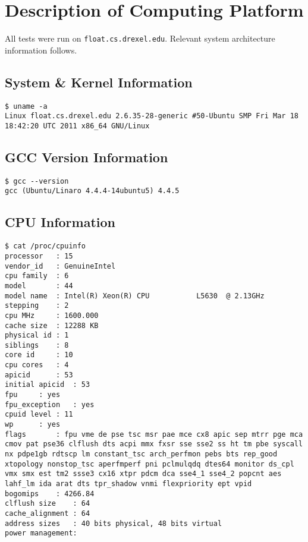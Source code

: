 \documentclass{article}
\begin{document}
\section{Description of Computing Platform}
All tests were run on \texttt{float.cs.drexel.edu}. Relevant system architecture information follows.
\subsection{System \& Kernel Information}
\begin{lstlisting}
$ uname -a
Linux float.cs.drexel.edu 2.6.35-28-generic #50-Ubuntu SMP Fri Mar 18 18:42:20 UTC 2011 x86_64 GNU/Linux
\end{lstlisting}
\subsection{GCC Version Information}
\begin{lstlisting}
$ gcc --version
gcc (Ubuntu/Linaro 4.4.4-14ubuntu5) 4.4.5
\end{lstlisting}
\subsection{CPU Information}
\begin{lstlisting}
$ cat /proc/cpuinfo
processor	: 15
vendor_id	: GenuineIntel
cpu family	: 6
model		: 44
model name	: Intel(R) Xeon(R) CPU           L5630  @ 2.13GHz
stepping	: 2
cpu MHz		: 1600.000
cache size	: 12288 KB
physical id	: 1
siblings	: 8
core id		: 10
cpu cores	: 4
apicid		: 53
initial apicid	: 53
fpu		: yes
fpu_exception	: yes
cpuid level	: 11
wp		: yes
flags		: fpu vme de pse tsc msr pae mce cx8 apic sep mtrr pge mca cmov pat pse36 clflush dts acpi mmx fxsr sse sse2 ss ht tm pbe syscall nx pdpe1gb rdtscp lm constant_tsc arch_perfmon pebs bts rep_good xtopology nonstop_tsc aperfmperf pni pclmulqdq dtes64 monitor ds_cpl vmx smx est tm2 ssse3 cx16 xtpr pdcm dca sse4_1 sse4_2 popcnt aes lahf_lm ida arat dts tpr_shadow vnmi flexpriority ept vpid
bogomips	: 4266.84
clflush size	: 64
cache_alignment	: 64
address sizes	: 40 bits physical, 48 bits virtual
power management:
\end{lstlisting}
\end{document}
